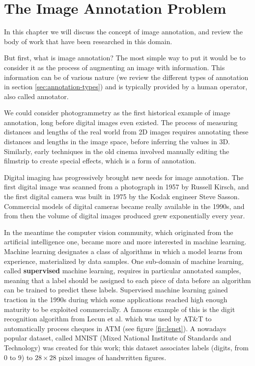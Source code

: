 \chapter{The Image Annotation Problem}%
\label{cha:the_image_annotation_problem}

\adjustmtc
\minitoc%

\newpage
In this chapter we will discuss the concept of image annotation, and review the body of work that have been researched in this domain. 

But first, what is image annotation? The most simple way to put it would be to consider it as the process of augmenting an image with information. This information can be of various nature (we review the different types of annotation in section \ref{sec:annotation-types}) and is typically provided by a human operator, also called annotator. 

We could consider photogrammetry as the first historical example of image annotation, long before digital images even existed. The process of measuring distances and lengths of the real world from 2D images requires annotating these distances and lengths in the image space, before inferring the values in 3D. Similarly, early techniques in the old cinema involved manually editing the filmstrip to create special effects, which is a form of annotation.

Digital imaging has progressively brought new needs for image annotation. The first digital image was scanned from a photograph in 1957 by Russell Kirsch, and the first digital camera was built in 1975 by the Kodak engineer Steve Sasson. Commercial models of digital cameras became really available in the 1990s, and from then the volume of digital images produced grew exponentially every year.

In the meantime the computer vision community, which originated from the artificial intelligence one, became more and more interested in machine learning. Machine learning designates a class of algorithms in which a model learns from experience, materialized by data samples. One sub-domain of machine learning, called \textbf{supervised} machine learning, requires in particular annotated samples, meaning that a label should be assigned to each piece of data before an algorithm can be trained to predict these labels. Supervised machine learning gained traction in the 1990s during which some applications reached high enough maturity to be exploited commercially. A famous example of this is the digit recognition algorithm from Lecun et al. \cite{lecun1998gradient} which was used by AT\&T to automatically process cheques in ATM (see figure \ref{fig:lenet}). A nowadays popular dataset, called MNIST (Mixed National Institute of Standards and Technology) was created for this work; this dataset associates labels (digits, from 0 to 9) to $28\times 28$ pixel images of handwritten figures. 


